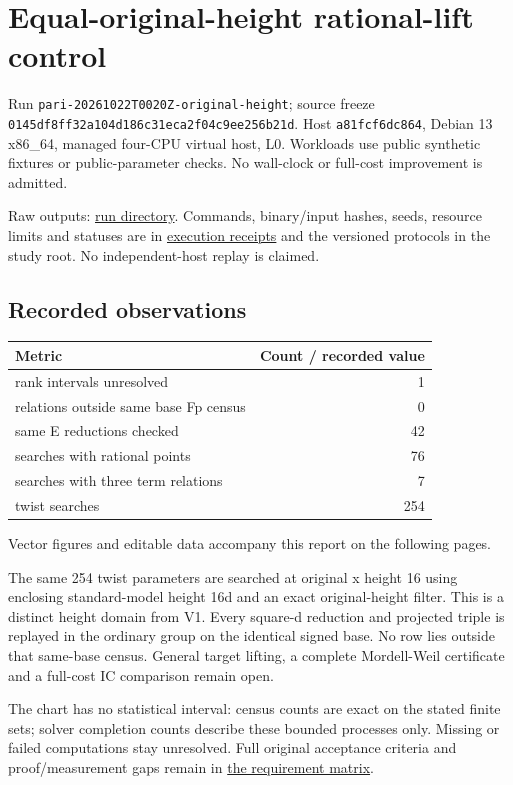 \documentclass[
  10pt,
  letterpaper,
  landscape]{article}
\author{}
\date{}
\begin{document}
\section{Equal-original-height rational-lift
control}\label{equal-original-height-rational-lift-control}

Run \texttt{pari-20261022T0020Z-original-height}; source freeze
\texttt{0145df8ff32a104d186c31eca2f04c9ee256b21d}. Host
\texttt{a81fcf6dc864}, Debian 13 x86\_64, managed four-CPU virtual host,
L0. Workloads use public synthetic fixtures or public-parameter checks.
No wall-clock or full-cost improvement is admitted.

Raw outputs:
\href{../../../execution-v1/runs/pari-20261022T0020Z-original-height/}{run
directory}. Commands, binary/input hashes, seeds, resource limits and
statuses are in \href{../../../execution-v1/}{execution receipts} and
the versioned protocols in the study root. No independent-host replay is
claimed.

\subsection{Recorded observations}\label{recorded-observations}

\begin{longtable}[]{@{}lr@{}}
\toprule\noalign{}
Metric & Count / recorded value \\
\midrule\noalign{}
\endhead
\bottomrule\noalign{}
\endlastfoot
rank intervals unresolved & 1 \\
relations outside same base Fp census & 0 \\
same E reductions checked & 42 \\
searches with rational points & 76 \\
searches with three term relations & 7 \\
twist searches & 254 \\
\end{longtable}

Vector figures and editable data accompany this report on the following pages.

The same 254 twist parameters are searched at original x height 16 using
enclosing standard-model height 16\textbar d\textbar{} and an exact
original-height filter. This is a distinct height domain from V1. Every
square-d reduction and projected triple is replayed in the ordinary
group on the identical signed base. No row lies outside that same-base
census. General target lifting, a complete Mordell-Weil certificate and
a full-cost IC comparison remain open.

The chart has no statistical interval: census counts are exact on the
stated finite sets; solver completion counts describe these bounded
processes only. Missing or failed computations stay unresolved. Full
original acceptance criteria and proof/measurement gaps remain in
\href{../../../EXPERIMENTS.md}{the requirement matrix}.
\end{document}
